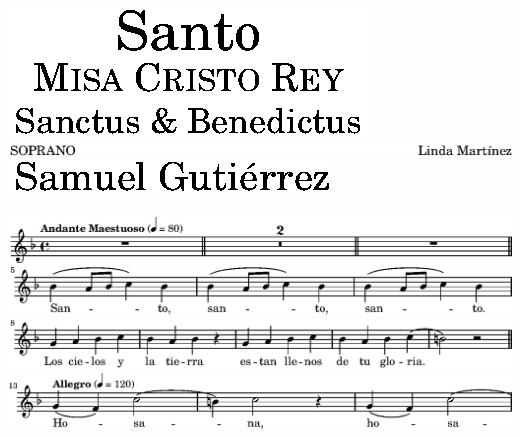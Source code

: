 \includegraphics{00/lily-ee0cfb43-1}%
\ifx\betweenLilyPondSystem \undefined
  \linebreak
\else
  \expandafter{}%
\fi
\includegraphics{00/lily-ee0cfb43-2}%
\ifx\betweenLilyPondSystem \undefined
  \linebreak
\else
  \expandafter{}%
\fi
\includegraphics{00/lily-ee0cfb43-3}%
\ifx\betweenLilyPondSystem \undefined
  \linebreak
\else
  \expandafter{}%
\fi
\includegraphics{00/lily-ee0cfb43-4}%
\ifx\betweenLilyPondSystem \undefined
  \linebreak
\else
  \expandafter{}%
\fi
\includegraphics{00/lily-ee0cfb43-5}%
\ifx\betweenLilyPondSystem \undefined
  \linebreak
\else
  \expandafter{}%
\fi
\includegraphics{00/lily-ee0cfb43-6}%
\ifx\betweenLilyPondSystem \undefined
  \linebreak
\else
  \expandafter{}%
\fi
\includegraphics{00/lily-ee0cfb43-7}%
\ifx\betweenLilyPondSystem \undefined
  \linebreak
\else
  \expandafter{}%
\fi
\includegraphics{00/lily-ee0cfb43-8}%
